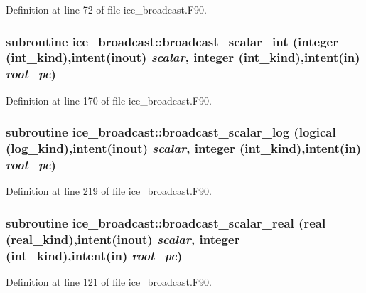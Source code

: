 Definition at line 72 of file ice\_\-broadcast.F90.\hypertarget{namespaceice__broadcast_a690996befa457dac88bf595ebc00c927}{
\subsubsection[{broadcast\_\-scalar\_\-int}]{\setlength{\rightskip}{0pt plus 5cm}subroutine ice\_\-broadcast::broadcast\_\-scalar\_\-int (integer (int\_\-kind),intent(inout) {\em scalar}, \/  integer (int\_\-kind),intent(in) {\em root\_\-pe})}}
\label{namespaceice__broadcast_a690996befa457dac88bf595ebc00c927}


Definition at line 170 of file ice\_\-broadcast.F90.\hypertarget{namespaceice__broadcast_ac3acffb99e12d5eb798f33eb05ad47ce}{
\subsubsection[{broadcast\_\-scalar\_\-log}]{\setlength{\rightskip}{0pt plus 5cm}subroutine ice\_\-broadcast::broadcast\_\-scalar\_\-log (logical (log\_\-kind),intent(inout) {\em scalar}, \/  integer (int\_\-kind),intent(in) {\em root\_\-pe})}}
\label{namespaceice__broadcast_ac3acffb99e12d5eb798f33eb05ad47ce}


Definition at line 219 of file ice\_\-broadcast.F90.\hypertarget{namespaceice__broadcast_a8b0dd76d223d7f8a6d4df7e90a347877}{
\subsubsection[{broadcast\_\-scalar\_\-real}]{\setlength{\rightskip}{0pt plus 5cm}subroutine ice\_\-broadcast::broadcast\_\-scalar\_\-real (real (real\_\-kind),intent(inout) {\em scalar}, \/  integer (int\_\-kind),intent(in) {\em root\_\-pe})}}
\label{namespaceice__broadcast_a8b0dd76d223d7f8a6d4df7e90a347877}


Definition at line 121 of file ice\_\-broadcast.F90.
